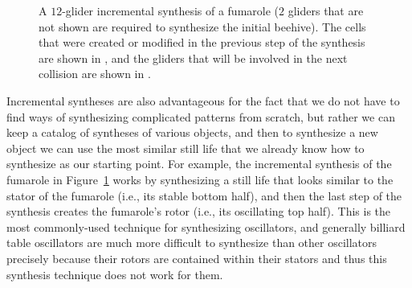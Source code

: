 \begin{figure}[!ht]
	\centering{}
	\caption{A $12$-glider incremental synthesis of a fumarole ($2$ gliders that are not shown are required to synthesize the initial beehive). The cells that were created or modified in the previous step of the synthesis are shown in , and the gliders that will be involved in the next collision are shown in .}\label{fig:fumarole_sequential}
\end{figure}

Incremental syntheses are also advantageous for the fact that we do not have to find ways of synthesizing complicated patterns from scratch, but rather we can keep a catalog of syntheses of various objects, and then to synthesize a new object we can use the most similar still life that we already know how to synthesize as our starting point. For example, the incremental synthesis of the fumarole in Figure~\ref{fig:fumarole_sequential} works by synthesizing a still life that looks similar to the stator of the fumarole (i.e., its stable bottom half), and then the last step of the synthesis creates the fumarole's rotor (i.e., its oscillating top half). This is the most commonly-used technique for synthesizing oscillators, and generally billiard table oscillators are much more difficult to synthesize than other oscillators precisely because their rotors are contained within their stators and thus this synthesis technique does not work for them.

